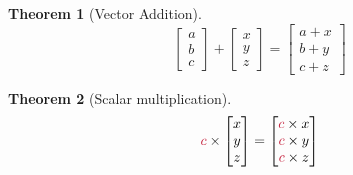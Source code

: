 \documentclass[12pt, a4paper]{article}
\newtheorem{thm}{Theorem}[subsection]
\begin{document}
\begin{thm}[Vector Addition]
$$\begin{bmatrix}a\\b\\c\end{bmatrix}+\begin{bmatrix}x\\y\\z\end{bmatrix}=\begin{bmatrix}a+x\\b+y\\c+z\end{bmatrix}$$
\end{thm}
\begin{thm}[Scalar multiplication]
$$\textcolor{red}{c}\times\begin{bmatrix}x\\y\\z\\ \end{bmatrix}=\begin{bmatrix}\textcolor{red}{c}\times x\\\textcolor{red}{c}\times y\\\textcolor{red}{c}\times z\end{bmatrix}$$
\end{thm}
\end{document}
